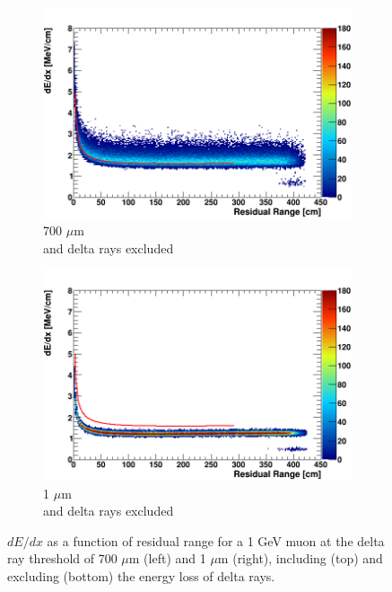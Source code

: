 \begin{figure}[t!]
\begin{subfigure}[b]{0.495\textwidth}
            \centering 
            \includegraphics[width=\textwidth]{derr_mu_only_700um}
            \caption{700 $\mu$m \\ and delta rays excluded}%
            \label{fig:derr_mu_only_700}
        \end{subfigure}
        \hfill
        \begin{subfigure}[b]{0.495\textwidth}   
            \centering 
            \includegraphics[width=\textwidth]{derr_mu_only_1um}
            \caption{1 $\mu$m \\ and delta rays excluded}%
            \label{fig:derr_mu_only_1}
        \end{subfigure}
        \caption[Energy-Residual Range Scale of Muons at Different Delta Ray Thresholds]{
	$dE/dx$ as a function of residual range for a 1 GeV muon at the delta ray threshold of 700 $\mu$m (left) and 1 $\mu$m (right), including (top) and excluding (bottom) the energy loss of delta rays. 
	}
        \label{fig:mu_derr}
\end{figure}

